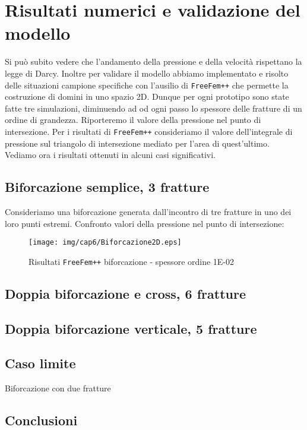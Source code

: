 \chapter{Risultati numerici e validazione del modello} 
Si pu\`{o} subito vedere che l'andamento della pressione e della velocit\`{a} rispettano la legge di Darcy.
Inoltre per validare il modello abbiamo implementato e risolto delle situazioni campione specifiche con l'ausilio di \texttt{FreeFem++} che permette la costruzione di domini in uno spazio 2D. Dunque per ogni prototipo sono state fatte tre simulazioni, diminuendo ad od ogni passo lo spessore delle fratture di un ordine di grandezza. 
Riporteremo il valore della pressione nel punto di intersezione. Per i risultati di \texttt{FreeFem++} consideriamo il valore dell'integrale di pressione sul triangolo di intersezione mediato per l'area di quest'ultimo.\\
Vediamo ora i risultati ottenuti in alcuni casi significativi.
\section{Biforcazione semplice, 3 fratture}
Consideriamo una biforcazione generata dall'incontro di tre fratture in uno dei loro punti estremi.
Confronto valori della pressione nel punto di intersezione:

\begin{figure}[h!]
\centering
\texttt{[image: img/cap6/Biforcazione2D.eps]}
\caption{Risultati \texttt{FreeFem++} biforcazione - spessore ordine 1E-02 }\label{Biforcazione1E-02}
\end{figure}


\section{Doppia biforcazione e cross, 6 fratture}
\section{Doppia biforcazione verticale, 5 fratture}

\section{Caso limite}
Biforcazione con due fratture

\section{Conclusioni}